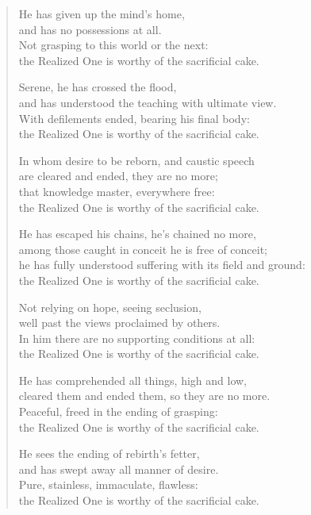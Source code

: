 \documentclass[12pt,openany]{book}%
\begin{document}
\begin{verse}
He has given up the mind’s home, \\
and has no possessions at all. \\
Not grasping to this world or the next: \\
the Realized One is worthy of the sacrificial cake. 

Serene, he has crossed the flood, \\
and has understood the teaching with ultimate view. \\
With defilements ended, bearing his final body: \\
the Realized One is worthy of the sacrificial cake. 

In whom desire to be reborn, and caustic speech \\
are cleared and ended, they are no more; \\
that knowledge master, everywhere free: \\
the Realized One is worthy of the sacrificial cake. 

He has escaped his chains, he’s chained no more, \\
among those caught in conceit he is free of conceit; \\
he has fully understood suffering with its field and ground: \\
the Realized One is worthy of the sacrificial cake. 

Not relying on hope, seeing seclusion, \\
well past the views proclaimed by others. \\
In him there are no supporting conditions at all: \\
the Realized One is worthy of the sacrificial cake. 

He has comprehended all things, high and low, \\
cleared them and ended them, so they are no more. \\
Peaceful, freed in the ending of grasping: \\
the Realized One is worthy of the sacrificial cake. 

He sees the ending of rebirth’s fetter, \\
and has swept away all manner of desire. \\
Pure, stainless, immaculate, flawless: \\
the Realized One is worthy of the sacrificial cake. 


\end{verse}
\end{document}
